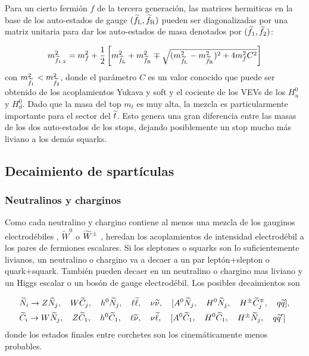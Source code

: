 Para un cierto fermión $f$ de la tercera generación, las matrices hermiticas en
la base de los auto-estados de gauge $(\widetilde{f}_{\mathrm{L}}, \widetilde{f}_{\mathrm{R}})$ pueden ser
diagonalizadas por una matriz unitaria para dar los auto-estados de masa
denotados por $(\widetilde{f}_{\mathrm{1}}, \widetilde{f}_{\mathrm{2}})$:

\begin{equation}
  m_{\widetilde{f}_{\mathrm{1,2}}}^2 = m^2_f + \frac{1}{2} \left[
    m_{\widetilde{f}_{\mathrm{L}}}^2 + m_{\widetilde{f}_{\mathrm{R}}}^2 \mp \sqrt{(m_{\widetilde{f}_{\mathrm{L}}}^2 -
      m_{\widetilde{f}_{\mathrm{R}}}^2)^2 + 4 m_f^2 C^2} \right]
\end{equation}
%
con $m_{\widetilde{f}_{\mathrm{1}}}^2 < m_{\widetilde{f}_{\mathrm{2}}}^2$, donde el parámetro $C$ es un
valor conocido que puede ser obtenido de los acoplamientos Yukava y soft y el
cociente de los VEVs de los $H_u^0$ y $H_d^0$. Dado que la masa del top $m_t$ es
muy alta, la mezcla es particularmente importante para el sector del $\widetilde{t}$.
Esto genera una gran diferencia entre las masas de los dos auto-estados de los
stops, dejando posiblemente un stop mucho más liviano a los demás squarks.


\subsection{Decaimiento de spartículas}

\subsubsection{Neutralinos y charginos}

Como cada neutralino y chargino contiene al menos una mezcla de los gauginos
electrodébiles {\bino}, $\tilde W^0$ o $\widetilde{W}^{\pm}$ , heredan los
acoplamientos de intensidad electrodébil a los pares de fermiones escalares. Si
los sleptones o squarks son lo suficientemente livianos, un neutralino o
chargino va a decaer a un par leptón+slepton o quark+squark. También pueden
decaer en un neutralino o chargino mas liviano y un Higgs escalar o un bosón
de gauge electrodébil. Los posibles decaimientos son

\begin{align*}
  &\widetilde{N}_i \rightarrow Z \widetilde{N}_j, \quad W \widetilde{C}_j, \quad h^0 \widetilde{N}_j, \quad
  \ell \widetilde{\ell}, \quad \nu \widetilde{\nu}, \quad [A^0 \widetilde{N}_j, \quad H^0
    \widetilde{N}_j, \quad H^{\pm} \widetilde{C}_j^{\mp}, \quad q \widetilde{q}],
  \\ &\widetilde{C}_i \rightarrow W \widetilde{N}_j, \quad Z \widetilde{C}_1, \quad h^0 \widetilde{C}_1,
  \quad \ell \widetilde{\nu}, \quad \nu \widetilde{\ell}, \quad [A^0 \widetilde{C}_1, \quad H^0
    \widetilde{C}_1, \quad H^{\pm} \widetilde{N}_j, \quad q \widetilde{q}']
\end{align*}
%
donde los estados finales entre corchetes son los cinemáticamente menos
probables.


